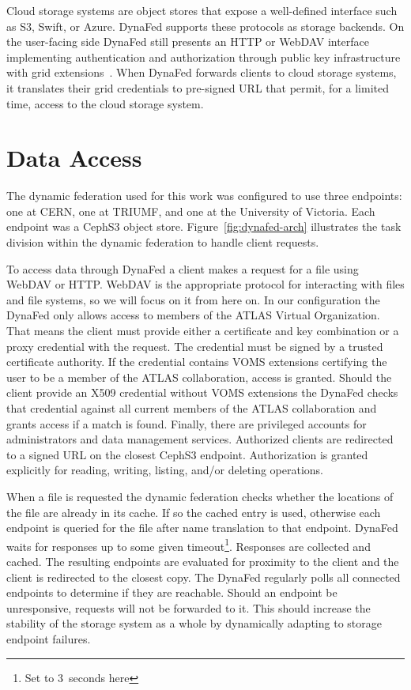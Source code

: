\documentclass[a4paper]{jpconf}
\begin{document}
Cloud storage systems are object stores that expose a well-defined interface such as S3, Swift, or Azure. DynaFed supports these protocols as storage backends. On the user-facing side DynaFed still presents an HTTP or WebDAV interface implementing authentication and authorization through public key infrastructure with grid extensions~\cite{voms}. When DynaFed forwards clients to cloud storage systems, it translates their grid credentials to pre-signed URL that permit, for a limited time, access to the cloud storage system.

\section{Data Access}
The dynamic federation used for this work was configured to use three endpoints: one at CERN, one at TRIUMF, and one at the University of Victoria. Each endpoint was a CephS3 object store. Figure~\ref{fig:dynafed-arch} illustrates the task division within the dynamic federation to handle client requests.

To access data through DynaFed a client makes a request for a file using WebDAV or HTTP. WebDAV is the appropriate protocol for interacting with files and file systems, so we will focus on it from here on. In our configuration the DynaFed only allows access to members of the ATLAS Virtual Organization. That means the client must provide either a certificate and key combination or a proxy credential with the request. The credential must be signed by a trusted certificate authority. If the credential contains VOMS extensions certifying the user to be a member of the ATLAS collaboration, access is granted. Should the client provide an X509 credential without VOMS extensions the DynaFed checks that credential against all current members of the ATLAS collaboration and grants access if a match is found. Finally, there are privileged accounts for administrators and data management services. Authorized clients are redirected to a signed URL on the closest CephS3 endpoint. Authorization is granted explicitly for reading, writing, listing, and/or deleting operations.

When a file is requested the dynamic federation checks whether the locations of the file are already in its cache. If so the cached entry is used, otherwise each endpoint is queried for the file after name translation to that endpoint. DynaFed waits for responses up to some given timeout\footnote{Set to 3~seconds here}. Responses are collected and cached. The resulting endpoints are evaluated for proximity to the client and the client is redirected to the closest copy. The DynaFed regularly polls all connected endpoints to determine if they are reachable. Should an endpoint be unresponsive, requests will not be forwarded to it. This should increase the stability of the storage system as a whole by dynamically adapting to storage endpoint failures.
\end{document}
